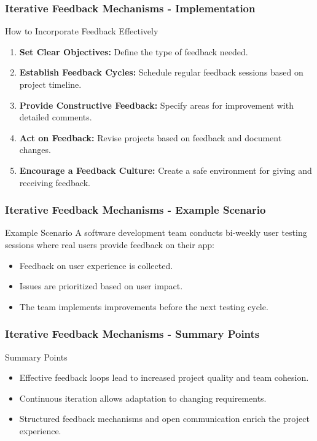 \documentclass[aspectratio=169]{beamer}
\begin{document}
\begin{frame}[fragile]
    \frametitle{Iterative Feedback Mechanisms - Implementation}
    \begin{block}{How to Incorporate Feedback Effectively}
        \begin{enumerate}
            \item \textbf{Set Clear Objectives:} Define the type of feedback needed.
            \item \textbf{Establish Feedback Cycles:} Schedule regular feedback sessions based on project timeline.
            \item \textbf{Provide Constructive Feedback:} Specify areas for improvement with detailed comments.
            \item \textbf{Act on Feedback:} Revise projects based on feedback and document changes.
            \item \textbf{Encourage a Feedback Culture:} Create a safe environment for giving and receiving feedback.
        \end{enumerate}
    \end{block}
\end{frame}

\begin{frame}[fragile]
    \frametitle{Iterative Feedback Mechanisms - Example Scenario}
    \begin{block}{Example Scenario}
        A software development team conducts bi-weekly user testing sessions where real users provide feedback on their app:
        \begin{itemize}
            \item Feedback on user experience is collected.
            \item Issues are prioritized based on user impact.
            \item The team implements improvements before the next testing cycle.
        \end{itemize}
    \end{block}
\end{frame}

\begin{frame}[fragile]
    \frametitle{Iterative Feedback Mechanisms - Summary Points}
    \begin{block}{Summary Points}
        \begin{itemize}
            \item Effective feedback loops lead to increased project quality and team cohesion.
            \item Continuous iteration allows adaptation to changing requirements.
            \item Structured feedback mechanisms and open communication enrich the project experience.
        \end{itemize}
    \end{block}
\end{frame}
\end{document}
